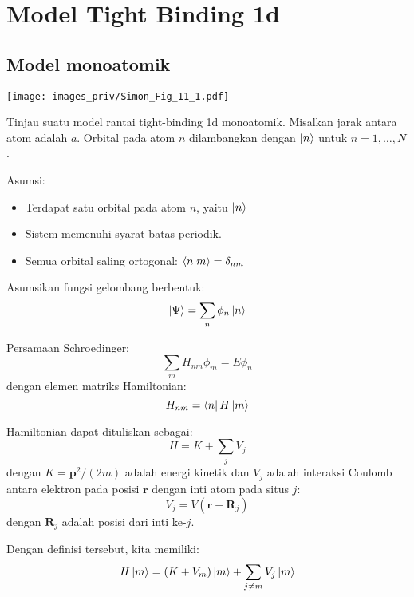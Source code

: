 \chapter{Model Tight Binding 1d}

\section{Model monoatomik}

{\centering
\texttt{[image: images\_priv/Simon\_Fig\_11\_1.pdf]}
\par}

Tinjau suatu model rantai tight-binding 1d monoatomik.
Misalkan jarak antara atom adalah $a$.
Orbital pada atom $n$ dilambangkan dengan $\ket{n}$ untuk
$n = 1,\ldots,N$.

Asumsi:
\begin{itemize}
\item Terdapat satu orbital pada atom $n$, yaitu $\ket{n}$
\item Sistem memenuhi syarat batas periodik.
\item Semua orbital saling ortogonal: $\braket{n | m} = \delta_{nm}$
\end{itemize}

Asumsikan fungsi gelombang berbentuk:
\begin{equation*}
\ket{\Psi} = \sum_{n} \phi_{n} \ket{n}
\end{equation*}

Persamaan Schroedinger:
\begin{equation*}
\sum_{m} H_{nm} \phi_{m} = E \phi_{n}
\end{equation*}
dengan elemen matriks Hamiltonian:
\begin{equation*}
H_{nm} = \bra{n}H\ket{m}
\end{equation*}

Hamiltonian dapat dituliskan sebagai:
\begin{equation*}
H = K + \sum_{j} V_{j}
\end{equation*}
dengan $K = \mathbf{p}^2/(2m)$ adalah energi kinetik dan $V_{j}$
adalah interaksi Coulomb antara elektron pada posisi $\mathbf{r}$
dengan inti atom pada situs $j$:
\begin{equation*}
V_{j} = V(\mathbf{r} - \mathbf{R}_{j})    
\end{equation*}
dengan $\mathbf{R}_{j}$ adalah posisi dari inti ke-$j$.

Dengan definisi tersebut, kita memiliki:
\begin{equation*}
H\ket{m} = (K + V_{m})\ket{m} + \sum_{j \neq m} V_{j}\ket{m}    
\end{equation*}

